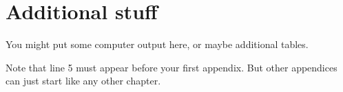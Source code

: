 \documentclass{aucklandthesis}
\begin{document}
\appendix

\hypertarget{additional-stuff}{%
\chapter{Additional stuff}\label{additional-stuff}}

You might put some computer output here, or maybe additional tables.

Note that line 5 must appear before your first appendix. But other appendices can just start like any other chapter.

\printbibliography[heading=bibintoc]
\end{document}
